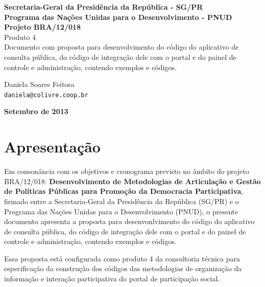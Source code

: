 \documentclass[11pt]{article}
\makeatletter
\newcommand{\MyName}{Daniela Soares Feitosa}
\newcommand{\MyEmail}{daniela@colivre.coop.br}
\newcommand{\ProductNumber}{Produto 4}
\newcommand{\ProductDescription}{Documento com proposta para
desenvolvimento do código do aplicativo de consulta pública, do código
de integração dele com o portal e do painel de controle e administração,
contendo exemplos e códigos.}
\newcommand{\MesEntrega}{Setembro de 2013}
\makeatother
\begin{document}
\lstset{language=Ruby}

\begin{titlepage}
  \begin{center}
   {\Large \textbf{Secretaria-Geral da Presidência da República - SG/PR}\\
    \Large \textbf{Programa das Nações Unidas para o Desenvolvimento -
PNUD}} \\[2cm]

   {\large \textbf{Projeto BRA/12/018}}\\[2cm]

   {\large {\ProductNumber \\
     \ProductDescription}}\\[5cm]

   \begin{minipage}{\textwidth}
    \MyName\\
    \texttt{\MyEmail}\\[2cm]
  \end{minipage}
  \vfill

\vspace{2cm}

\large \textbf{\MesEntrega}
\end{center}
\end{titlepage}

\tableofcontents
\clearpage
\listoffigures

\clearpage

\section{Apresentação}

Em consonância com os objetivos e cronograma previsto no âmbito do
projeto BRA/12/018:
\textbf{Desenvolvimento de Metodologias de Articulação e Gestão de
Políticas Públicas para Promoção da Democracia Participativa},
firmado entre a Secretaria-Geral da Presidência da República
(SG/PR) e o Programa das Nações Unidas para o Desenvolvimento (PNUD),
o presente documento apresenta a proposta para
desenvonlvimento do código do aplicativo de consulta pública, do código
de integração dele com o portal e do painel de controle e
administração, contendo exemplos e códigos.

Essa proposta está configurada como produto 4 da consultoria técnica
para especificação da construção dos códigos das metodologias de
organização da informação e interação participativa do portal de
participação social.
\end{document}
